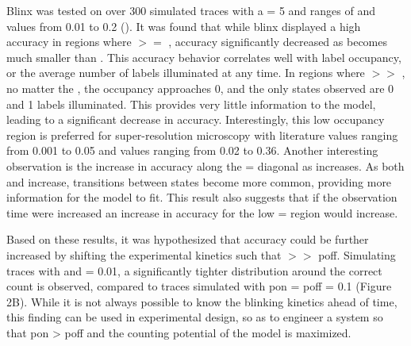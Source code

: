 Blinx was tested on over 300 simulated traces with a \truen = 5 and ranges of
\pon and \poff values from 0.01 to 0.2 (). It was found that while blinx
displayed a high accuracy in regions where \pon $>=$ \poff, accuracy significantly
decreased as \pon becomes much smaller than \poff. This accuracy behavior
correlates well with label occupancy, or the average number of labels
illuminated at any time. In regions where \poff  $>>$ \pon, no matter the \truen,
the occupancy approaches 0, and the only states observed are 0 and 1 labels
illuminated. This provides very little information to the model, leading to a
significant decrease in accuracy. Interestingly, this low occupancy region is
preferred for super-resolution microscopy with literature \pon values ranging
from 0.001 to 0.05 and \poff values ranging from 0.02 to 0.36. Another
interesting observation is the increase in accuracy along the \pon = \poff
diagonal as \pon increases. As both \pon and \poff increase, transitions between
states become more common, providing more information for the model to fit.
This result also suggests that if the observation time were increased an
increase in accuracy for the low \pon = \poff region would increase.

Based on these results, it was hypothesized that accuracy could be further
increased by shifting the experimental kinetics such that \pon $>>$ poff. Simulating
traces with  and \poff= 0.01, a significantly tighter distribution
around the correct count is observed, compared to traces simulated with pon =
poff = 0.1 (Figure 2B). While it is not always possible to know the blinking
kinetics ahead of time, this finding can be used in experimental design, so as
to engineer a system so that pon > poff and the counting potential of the model
is maximized.
